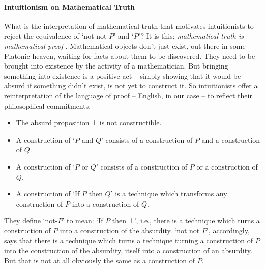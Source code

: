 \paragraph{Intuitionism on Mathematical Truth} What is the interpretation of mathematical truth that motivates intuitionists to reject the equivalence of `not-not-$P$' and `$P$'? It is this: \emph{mathematical truth is mathematical proof} \citep{shap}. Mathematical objects don't just exist, out there in some Platonic heaven, waiting for facts about them to be discovered. They need to be brought into existence by the activity of a mathematician. But bringing something into existence is a positive act – simply showing that it would be absurd if something didn't exist, is not yet to construct it. So intuitionists offer a reinterpretation of the language of proof – English, in our case – to reflect their philosophical commitments. \begin{itemize}
  \item The absurd proposition $\bot$ is not constructible.
\item A construction of `$P$ and $Q$' consists of a construction of $P$ and a construction of $Q$.
\item A construction of `$P$ or $Q$' consists of a construction of $P$ or a construction of $Q$.
\item A construction of `If $P$ then $Q$' is a technique which transforms any construction of $P$ into a construction of $Q$.
\end{itemize} They define `not-$P$' to mean: `If $P$ then $\bot$', i.e., there is a technique which turns a construction of $P$ into a construction of the absurdity. `not not $P$', accordingly, says that there is a technique which turns a technique turning a construction of $P$ into the construction of the absurdity, itself into a construction of an absurdity. But that is not at all obviously the same as a construction of $P$.

